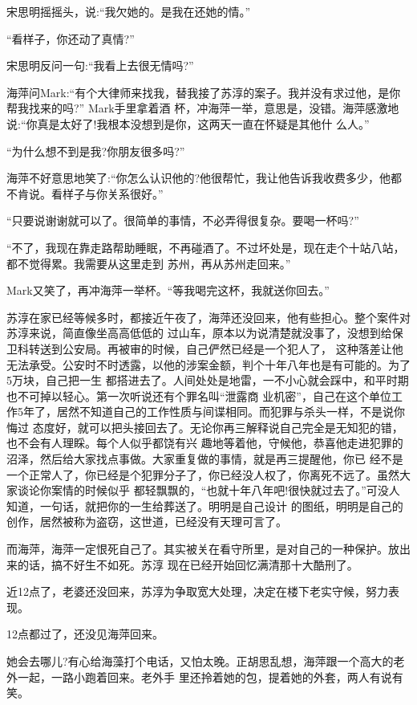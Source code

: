 \documentclass[11pt,a4paper,onecolumn]{article}
\begin{document}
宋思明摇摇头，说:``我欠她的。是我在还她的情。''

``看样子，你还动了真情?''

宋思明反问一句:``我看上去很无情吗?''

海萍问Mark:``有个大律师来找我，替我接了苏淳的案子。我并没有求过他，是你帮我找来的吗?'' Mark手里拿着酒
杯，冲海萍一举，意思是，没错。海萍感激地说:``你真是太好了!我根本没想到是你，这两天一直在怀疑是其他什
么人。''

``为什么想不到是我?你朋友很多吗?''

海萍不好意思地笑了:``你怎么认识他的?他很帮忙，我让他告诉我收费多少，他都不肯说。看样子与你关系很好。''

``只要说谢谢就可以了。很简单的事情，不必弄得很复杂。要喝一杯吗?''

``不了，我现在靠走路帮助睡眠，不再碰酒了。不过坏处是，现在走个十站八站，都不觉得累。我需要从这里走到
苏州，再从苏州走回来。''

Mark又笑了，再冲海萍一举杯。``等我喝完这杯，我就送你回去。''

苏淳在家已经等候多时，都接近午夜了，海萍还没回来，他有些担心。整个案件对苏淳来说，简直像坐高高低低的
过山车，原本以为说清楚就没事了，没想到给保卫科转送到公安局。再被审的时候，自己俨然已经是一个犯人了，
这种落差让他无法承受。公安时不时透露，以他的涉案金额，判个十年八年也是有可能的。为了5万块，自己把一生
都搭进去了。人间处处是地雷，一不小心就会踩中，和平时期也不可掉以轻心。第一次听说还有个罪名叫``泄露商
业机密''，自己在这个单位工作5年了，居然不知道自己的工作性质与间谍相同。而犯罪与杀头一样，不是说你悔过
态度好，就可以把头接回去了。无论你再三解释说自己完全是无知犯的错，也不会有人理睬。每个人似乎都饶有兴
趣地等着他，守候他，恭喜他走进犯罪的沼泽，然后给大家找点事做。大家重复做的事情，就是再三提醒他，你已
经不是一个正常人了，你已经是个犯罪分子了，你已经没人权了，你离死不远了。虽然大家谈论你案情的时候似乎
都轻飘飘的，``也就十年八年吧!很快就过去了。''可没人知道，一句话，就把你的一生给葬送了。明明是自己设计
的图纸，明明是自己的创作，居然被称为盗窃，这世道，已经没有天理可言了。

而海萍，海萍一定恨死自己了。其实被关在看守所里，是对自己的一种保护。放出来的话，搞不好生不如死。苏淳
现在已经开始回忆满清那十大酷刑了。

近12点了，老婆还没回来，苏淳为争取宽大处理，决定在楼下老实守候，努力表现。

12点都过了，还没见海萍回来。

她会去哪儿?有心给海藻打个电话，又怕太晚。正胡思乱想，海萍跟一个高大的老外一起，一路小跑着回来。老外手
里还拎着她的包，提着她的外套，两人有说有笑。
\end{document}
